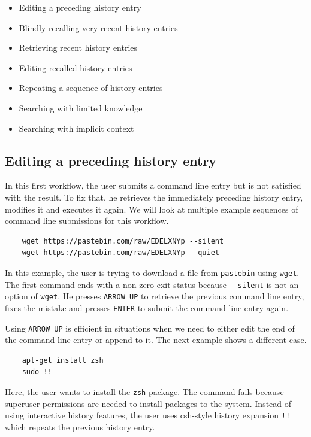 \documentclass[thesis=M,english]{FITthesis}[2012/10/20]
\begin{document}
\begin{itemize}
    \item Editing a preceding history entry
    \item Blindly recalling very recent history entries
    \item Retrieving recent history entries
    \item Editing recalled history entries
    \item Repeating a sequence of history entries
    \item Searching with limited knowledge
    \item Searching with implicit context
\end{itemize}


\subsection{Editing a preceding history entry}

In this first workflow, the user submits a command line entry but is not satisfied with the result. To fix that, he retrieves the immediately preceding history entry, modifies it and executes it again. We will look at multiple example sequences of command line submissions for this workflow.

\begin{verbatim}
    wget https://pastebin.com/raw/EDELXNYp --silent
    wget https://pastebin.com/raw/EDELXNYp --quiet
\end{verbatim}
In this example, the user is trying to download a file from \verb|pastebin| using \verb|wget|. The first command ends with a non-zero exit status because \verb|--silent| is not an option of \verb|wget|. He presses \verb|ARROW_UP| to retrieve the previous command line entry, fixes the mistake and presses \verb|ENTER| to submit the command line entry again. 

Using \verb|ARROW_UP| is efficient in situations when we need to either edit the end of the command line entry or append to it. %
The next example shows a different case.

\begin{verbatim}
    apt-get install zsh
    sudo !!
\end{verbatim}

Here, the user wants to install the \verb|zsh| package. The command fails because superuser permissions are needed to install packages to the system. Instead of using interactive history features, the user uses csh-style history expansion \verb|!!| which repeats the previous history entry. 
\end{document}
